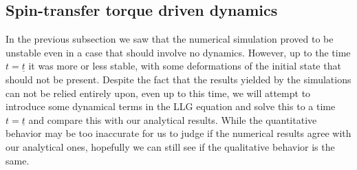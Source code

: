 \subsection{Spin-transfer torque driven dynamics}
In the previous subsection we saw that the numerical simulation proved to be unstable even in a case that should involve no dynamics. However, up to the time $t=\underline{t}$ it was more or less stable, with some deformations of the initial state that should not be present. Despite the fact that the results yielded by the simulations can not be relied entirely upon, even up to this time, we will attempt to introduce some dynamical terms in the LLG equation and solve this to a time $t=\underline{t}$ and compare this with our analytical results. While the quantitative behavior may be too inaccurate for us to judge if the numerical results agree with our analytical ones, hopefully we can still see if the qualitative behavior is the same. 
